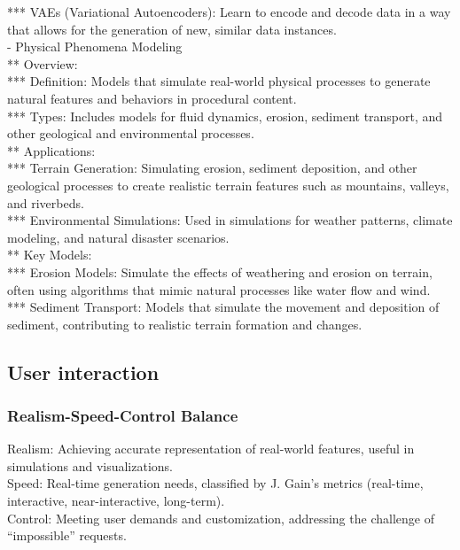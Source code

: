 *** VAEs (Variational Autoencoders): Learn to encode and decode data in a way that allows for the generation of new, similar data instances. \\
- Physical Phenomena Modeling \\
** Overview: \\
*** Definition: Models that simulate real-world physical processes to generate natural features and behaviors in procedural content. \\
*** Types: Includes models for fluid dynamics, erosion, sediment transport, and other geological and environmental processes. \\
** Applications: \\
*** Terrain Generation: Simulating erosion, sediment deposition, and other geological processes to create realistic terrain features such as mountains, valleys, and riverbeds. \\
*** Environmental Simulations: Used in simulations for weather patterns, climate modeling, and natural disaster scenarios. \\
** Key Models: \\
*** Erosion Models: Simulate the effects of weathering and erosion on terrain, often using algorithms that mimic natural processes like water flow and wind. \\
*** Sediment Transport: Models that simulate the movement and deposition of sediment, contributing to realistic terrain formation and changes.

\subsection{User interaction}
\subsubsection{Realism-Speed-Control Balance}
Realism: Achieving accurate representation of real-world features, useful in simulations and visualizations. \\
Speed: Real-time generation needs, classified by J. Gain’s metrics (real-time, interactive, near-interactive, long-term). \\
Control: Meeting user demands and customization, addressing the challenge of “impossible” requests.


